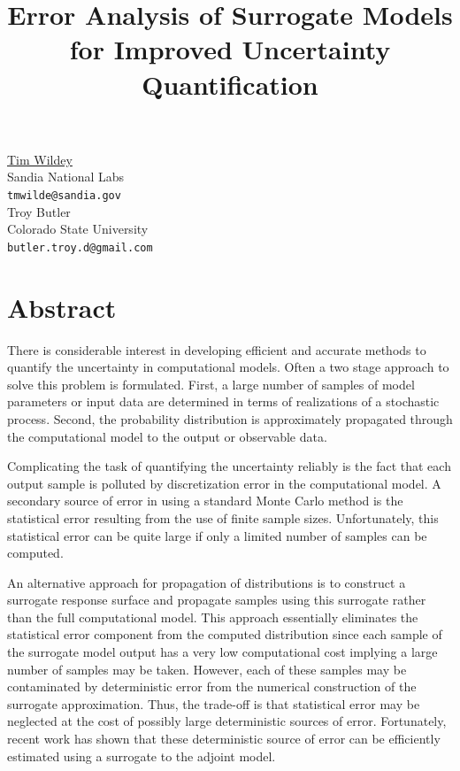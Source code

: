 \documentclass[article,A4,11pt]{llncs}%
\begin{document}
\title{Error Analysis of Surrogate Models for Improved Uncertainty Quantification}
 \author{} \institute{}
\maketitle
\begin{center}
{\large \underline{Tim Wildey}}\\
Sandia National Labs\\
{\tt tmwilde@sandia.gov}
\\ \vspace{4mm}
{\large Troy Butler}\\
Colorado State University\\
{\tt butler.troy.d@gmail.com}
\end{center}

\section*{Abstract}
There is considerable interest in developing efficient and accurate methods to quantify the uncertainty in computational models.  Often a two stage approach to solve this problem is formulated. First, a large number of samples of model parameters or input data are determined in terms of realizations of a stochastic process. Second, the probability distribution is approximately propagated through the computational model to the output or observable data. 

Complicating the task of quantifying the uncertainty reliably is the fact that each output sample is polluted by discretization error in the computational model.  A secondary source of error in using a standard Monte Carlo method is the statistical error resulting from the use of finite sample sizes. Unfortunately, this statistical error can be quite large if only a limited number of samples can be computed.

An alternative approach for propagation of distributions is to construct a surrogate response surface and propagate samples using this surrogate rather than the full computational model. This approach essentially eliminates the statistical error component from the computed distribution since each sample of the surrogate model output has a very low computational cost implying a large number of samples may be taken.  However, each of these samples may be contaminated by deterministic error from the numerical construction of the surrogate approximation. Thus, the trade-off is that statistical error may be neglected at the cost of possibly large deterministic sources of error.  Fortunately, recent work has shown that these deterministic source of error can be efficiently estimated using a surrogate to the adjoint model.
\end{document}
